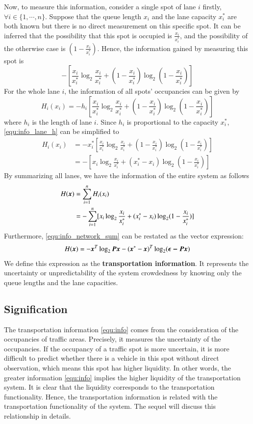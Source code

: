 \documentclass[preprint,authoryear,12pt]{elsarticle}
\renewcommand{\vec}[1]{\mbox{\boldmath$#1$}}
\newcommand{\mat}[1]{\mbox{\boldmath$#1$}}
\begin{document}
Now, to measure this information, consider a single spot of lane $i$
firstly, $\forall i\in\{1,\cdots,n\}$. Suppose that the queue length
$x_i$ and the lane capacity $x_i^*$ are both known but there is no
direct measurement on this specific spot. It can be inferred that the
possibility that this spot is occupied is $\frac{x_i}{x_i^*}$, and
the possibility of the otherwise case is $(1-\frac{x_i}{x_i^*})$.
Hence, the information gained by measuring this spot is
$$-[\frac{x_i}{x_i^*} \log_2 \frac{x_i}{x_i^*}+(1-\frac{x_i}{x_i^*})
\log_2 (1-\frac{x_i}{x_i^*})]
$$
For the whole lane $i$, the information of all spots' occupancies can
be given by
\begin{equation}\label{equ:info_lane_h}
H_i(x_i) = -h_i[\frac{x_i}{x_i^*} \log_2
\frac{x_i}{x_i^*}+(1-\frac{x_i}{x_i^*}) \log_2 (1-\frac{x_i}{x_i^*})]
\end{equation}
where $h_i$ is the length of lane $i$. Since $h_i$ is proportional to
the capacity $x_i^*$, \eqref{equ:info_lane_h} can be simplified to
\begin{align}
H_i(x_i) &= -x_i^*[\frac{x_i}{x_i^*} \log_2
\frac{x_i}{x_i^*}+(1-\frac{x_i}{x_i^*}) \log_2
(1-\frac{x_i}{x_i^*})] \nonumber\\
&=-[x_i \log_2 \frac{x_i}{x_i^*}+(x_i^*-x_i) \log_2
(1-\frac{x_i}{x_i^*})] \label{equ:info_lane}
\end{align}
By summarizing all lanes, we have the information of the entire
system as follows
\begin{align}
H(\vec{x}) &= \sum_{i=1}^n H_i(x_i)\nonumber\\
&= - \sum_{i=1}^n [x_i \log_2 \frac{x_i}{x_i^*}+(x_i^*-x_i) \log_2
(1-\frac{x_i}{x_i^*})]\label{equ:info_network_sum}
\end{align}
Furthermore, \eqref{equ:info_network_sum} can be restated as the
vector expression:
\begin{equation}\label{equ:info}
H(\vec{x}) = -\vec{x}^T\log_2\mat{P}\vec{x}
-(\vec{x}^*-\vec{x})^T\log_2(\vec{\epsilon-\mat{P}\vec{x}})
\end{equation}
We define this expression as the \textbf{transportation information}.
It represents the uncertainty or unpredictability of the system
crowdedness by knowing only the queue lengths and the lane
capacities.

\subsection{Signification}

The transportation information \eqref{equ:info} comes from the
consideration of the occupancies of traffic areas. Precisely, it
measures the uncertainty of the occupancies. If the occupancy of a
traffic spot is more uncertain, it is more difficult to predict
whether there is a vehicle in this spot without direct observation,
which means this spot has higher liquidity. In other words, the
greater information \eqref{equ:info} implies the higher liquidity of
the transportation system. It is clear that the liquidity corresponds
to the transportation functionality. Hence, the transportation
information is related with the transportation functionality of the
system. The sequel will discuss this relationship in details.
\end{document}
